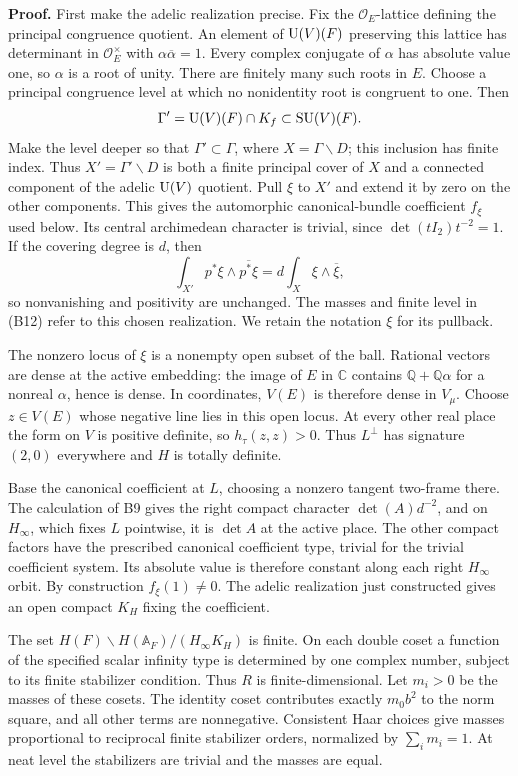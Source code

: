\documentclass[11pt]{article}
\newcommand{\Q}{\mathbb Q}\newcommand{\C}{\mathbb C}\newcommand{\Z}{\mathbb Z}\newcommand{\R}{\mathbb R}\newcommand{\A}{\mathbb A}\newcommand{\OO}{\mathcal O}
\theoremstyle{definition}\newtheorem{definition}[theorem]{Definition}\newtheorem{remark}[theorem]{Remark}
\begin{document}
\textbf{Proof.} First make the adelic realization precise. Fix the $\mathcal O_E$-lattice defining the principal congruence quotient. An element of $\operatorname{U}(V)(F)$ preserving this lattice has determinant in $\mathcal O_E^\times$ with $\alpha\overline\alpha=1$. Every complex conjugate of $\alpha$ has absolute value one, so $\alpha$ is a root of unity. There are finitely many such roots in $E$. Choose a principal congruence level at which no nonidentity root is congruent to one. Then
\[
 \Gamma'=\operatorname{U}(V)(F)\cap K_f\subset\operatorname{SU}(V)(F).
\]
Make the level deeper so that $\Gamma'\subset\Gamma$, where $X=\Gamma\backslash D$; this inclusion has finite index. Thus $X'=\Gamma'\backslash D$ is both a finite principal cover of $X$ and a connected component of the adelic $\operatorname{U}(V)$ quotient. Pull $\xi$ to $X'$ and extend it by zero on the other components. This gives the automorphic canonical-bundle coefficient $f_\xi$ used below. Its central archimedean character is trivial, since $\det(tI_2)t^{-2}=1$. If the covering degree is $d$, then
\[
 \int_{X'}p^*\xi\wedge\overline{p^*\xi}
       =d\int_X\xi\wedge\overline\xi,
\]
so nonvanishing and positivity are unchanged. The masses and finite level in (B12) refer to this chosen realization. We retain the notation $\xi$ for its pullback.

The nonzero locus of $\xi$ is a nonempty open subset of the ball. Rational vectors are dense at the active embedding: the image of $E$ in $\C$ contains $\Q+\Q\alpha$ for a nonreal $\alpha$, hence is dense. In coordinates, $V(E)$ is therefore dense in $V_\mu$. Choose $z\in V(E)$ whose negative line lies in this open locus. At every other real place the form on $V$ is positive definite, so $h_\tau(z,z)>0$. Thus $L^\perp$ has signature $(2,0)$ everywhere and $H$ is totally definite.

Base the canonical coefficient at $L$, choosing a nonzero tangent two-frame there. The calculation of B9 gives the right compact character $\det(A)d^{-2}$, and on $H_\infty$, which fixes $L$ pointwise, it is $\det A$ at the active place. The other compact factors have the prescribed canonical coefficient type, trivial for the trivial coefficient system. Its absolute value is therefore constant along each right $H_\infty$ orbit. By construction $f_\xi(1)\ne0$. The adelic realization just constructed gives an open compact $K_H$ fixing the coefficient.

The set $H(F)\backslash H(\A_F)/(H_\infty K_H)$ is finite. On each double coset a function of the specified scalar infinity type is determined by one complex number, subject to its finite stabilizer condition. Thus $R$ is finite-dimensional. Let $m_i>0$ be the masses of these cosets. The identity coset contributes exactly $m_0b^2$ to the norm square, and all other terms are nonnegative. Consistent Haar choices give masses proportional to reciprocal finite stabilizer orders, normalized by $\sum_i m_i=1$. At neat level the stabilizers are trivial and the masses are equal.
\end{document}

